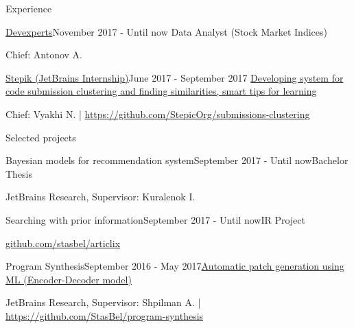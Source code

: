 \documentclass{resume} %
\newcommand{\SKIPSM}{\vspace{-0.7\baselineskip}}
\begin{document}
\begin{rSection}{Experience}

\begin{rSubsection}{\href{http://stepik.org/}{Devexperts}}{November 2017 - Until now}
{Data Analyst (Stock Market Indices)}{} 
\item[] Chief: Antonov A.
\end{rSubsection}

\begin{rSubsection}{\href{http://stepik.org/}{Stepik (JetBrains Internship)}}{June 2017 - September 2017}
{\href{https://jetbrains.ru/students/internship/themes/again/}{Developing system for code submission clustering and finding similarities, smart tips for learning}}{} 
\item[] Chief: Vyakhi N. | \url{https://github.com/StepicOrg/submissions-clustering}
\end{rSubsection}

\end{rSection} 
\SKIPSM
\begin{rSection}{Selected projects}

\begin{rSubsection}{Bayesian models for recommendation system}{September 2017 - Until now}{Bachelor Thesis}{}
\item[] JetBrains Research, Supervisor: Kuralenok I.
\end{rSubsection}

\begin{rSubsection}{Searching with prior information}{September 2017 - Until now}{IR Project}{}
\item[] \url{github.com/stasbel/articlix}
\end{rSubsection}

\begin{rSubsection}{Program Synthesis}{September 2016 - May 2017}{\href{https://docs.google.com/presentation/d/113EFcW8L7p8ickhfMoht8ivOomq2fRPizLtWSH9cSX4/pub?start=false&loop=false&delayms=3000}{Automatic patch generation using ML (Encoder-Decoder model)}}{}
\item[] JetBrains Research, Supervisor: Shpilman A. | \url{https://github.com/StasBel/program-synthesis}
\end{rSubsection}

\end{rSection}
\SKIPSM
\end{document}
